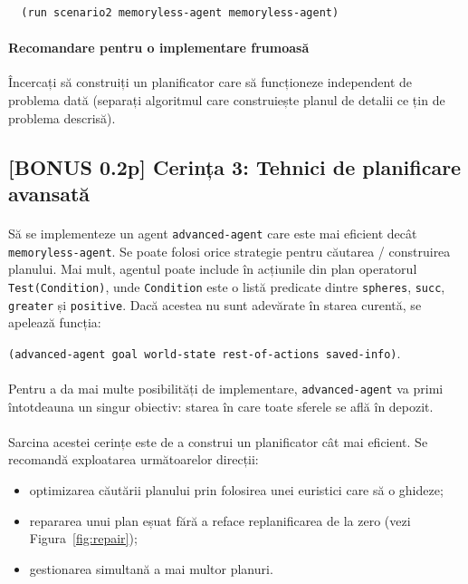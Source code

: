 \documentclass[12pt]{article}
\newcommand{\repr}[1]{{\color{sapphire}\texttt{#1}}}
\begin{document}
\begin{verbatim}
  (run scenario2 memoryless-agent memoryless-agent)
\end{verbatim}


\paragraph{Recomandare pentru o implementare frumoasă}

Încercați să construiți un planificator care să funcționeze
independent de problema dată (separați algoritmul care construiește
planul de detalii ce țin de problema descrisă).

\subsection{[BONUS 0.2p] Cerința 3: Tehnici de planificare avansată}

\paragraph{}

Să se implementeze un agent \repr{advanced-agent} care este mai
eficient decât \repr{memoryless-agent}. Se poate folosi orice
strategie pentru căutarea / construirea planului. Mai mult, agentul
poate include în acțiunile din plan operatorul
\repr{Test(Condition)}, unde \repr{Condition} este o listă
predicate dintre \repr{spheres}, \repr{succ}, \repr{greater} și
\repr{positive}. Dacă acestea nu sunt adevărate în starea curentă,
se apelează funcția:
\begin{center}
  \repr{(advanced-agent goal world-state rest-of-actions
    saved-info)}.
\end{center}

\paragraph{}

Pentru a da mai multe posibilități de implementare,
\repr{advanced-agent} va primi întotdeauna un singur obiectiv: starea
în care toate sferele se află în depozit.

\paragraph{}

Sarcina acestei cerințe este de a construi un planificator cât mai
eficient. Se recomandă exploatarea următoarelor direcții:
\begin{itemize}
\item optimizarea căutării planului prin folosirea unei euristici care
  să o ghideze;
\item repararea unui plan eșuat fără a reface replanificarea de la
  zero (vezi Figura~\ref{fig:repair});
\item gestionarea simultană a mai multor planuri.
\end{itemize}
\end{document}
